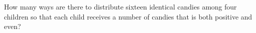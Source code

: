 How many ways are there to distribute sixteen identical candies among four children so that each child receives a number of candies that is both positive and even?

